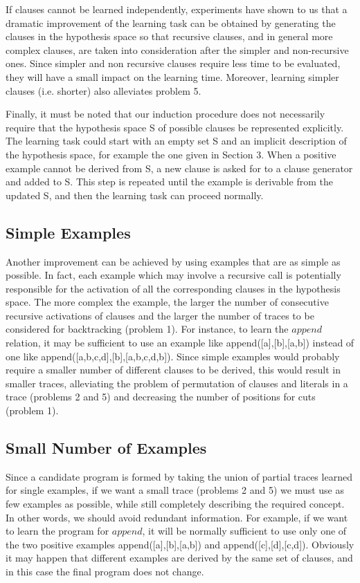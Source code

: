 If clauses cannot be learned independently,
experiments have shown to us that a
dramatic improvement of the learning task can be obtained by
generating the clauses in the hypothesis space so that recursive clauses,
and in general more complex clauses, are taken into consideration
after the simpler and non-recursive ones. 
Since simpler and non recursive clauses require less time to be evaluated,
they will have a small impact on the learning time.
Moreover, learning simpler clauses (i.e. shorter) also alleviates problem 5.
 
Finally, it must be noted that our induction procedure does not
necessarily require that the hypothesis space S of possible clauses
be represented explicitly.
The learning task could start with an empty set S
and an implicit description of the hypothesis space, for example
the one given 
in Section 3. When a positive example cannot be derived from S,
a new clause is asked for to a clause generator and added to 
S. This step is repeated until the example is derivable from the updated S, and
then the learning task can proceed normally.
 
\subsection{Simple Examples}
 
Another improvement can be achieved by using examples that
are as simple as possible. In fact, each
example which may involve a recursive call is potentially responsible
for the activation of all the corresponding clauses 
in the hypothesis space.
The more complex the example, the larger the number
of consecutive recursive activations of clauses and the
larger the number of traces to be considered for backtracking (problem 1). 
For instance, to learn the $append$ relation, it may be sufficient
to use an example like append([a],[b],[a,b]) instead of one like
append([a,b,c,d],[b],[a,b,c,d,b]). Since simple examples would probably
require a smaller number of different clauses to be derived, this
would result in smaller traces, alleviating the problem of permutation
of clauses and literals in a trace (problems 2 and 5) 
and decreasing the number of positions for cuts (problem 1).
 
\subsection{Small Number of Examples}
Since a candidate program is formed by taking 
the union of partial traces learned for single examples, if we want
a small trace (problems 2 and 5) we must use
as few examples as possible, while still completely 
describing the required concept.
In other words, we should avoid redundant 
information. For example, if we want to learn the program for $append$,
it will be normally sufficient to use only one of the two positive
examples append([a],[b],[a,b]) and append([c],[d],[c,d]). Obviously it
may happen that different examples are 
derived by the same set of clauses,
and in this case the final program does not change. 
 
